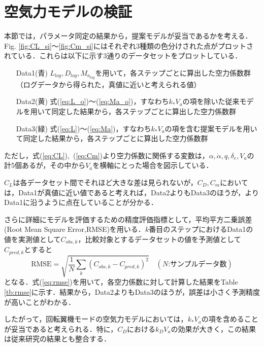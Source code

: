 \section{空気力モデルの検証}
\label{sec:airf_model_ver}

本節では，パラメータ同定の結果から，提案モデルが妥当であるかを考える．Fig. \ref{fig:CL_si}〜\ref{fig:Cm_si}にはそれぞれ3種類の色分けされた点がプロットされている．これらは以下に示す3通りのデータセットをプロットしている．

\begin{itemize}
  \setlength{\leftskip}{1.0cm}
  \setlength{\rightskip}{0.5cm}
  \item[Data1(青)] $L_{log},D_{log},M_{a_{log}}$を用いて，各ステップごとに算出した空力係数群\\（ログデータから得られた，真値に近いと考えられる値）
  \item[Data2(黄)] 式(\ref{eq:L_o})〜(\ref{eq:Ma_o})，すなわち$k_* V_a$の項を除いた従来モデルを用いて同定した結果から，各ステップごとに算出した空力係数群
  \item[Data3(緑)] 式(\ref{eq:L})〜(\ref{eq:Ma})，すなわち$k_* V_a$の項を含む提案モデルを用いて同定した結果から，各ステップごとに算出した空力係数群
\end{itemize}

ただし，式(\ref{eq:CL}),~(\ref{eq:Cm})より空力係数に関係する変数は，$\alpha,\dot{\alpha},q,\delta_e,V_a$の計5個あるが，その中から$V_a$を横軸にとった場合を図示している．

$C_L$は各データセット間でそれほど大きな差は見られないが，$C_D,C_m$においては，Data1が真値に近い値であると考えれば，Data2よりもData3のほうが，よりData1に沿うように点在していることが分かる．

さらに詳細にモデルを評価するための精度評価指標として，平均平方二乗誤差(Root Mean Square Error,RMSE)を用いる．$k$番目のステップにおけるData1の値を実測値として$C_{obs,k}$，比較対象とするデータセットの値を予測値として$C_{pred,k}$とすると
\begin{equation}
  \mbox{RMSE} = \sqrt{\dfrac{1}{N}\sum_{k}(C_{obs,k}-C_{pred,k})^{2}} \quad (N\mbox{:サンプルデータ数})
  \label{eq:rmse}
\end{equation}
となる\cite{}．式(\ref{eq:rmse})を用いて，各空力係数に対して計算した結果をTable \ref{tb:rmse}に示す．結果から，Data2よりもData3のほうが，誤差は小さく予測精度が高いことがわかる．

したがって，回転翼機モードの空気力モデルにおいては，$k_* V_a$の項を含めることが妥当であると考えられる．特に，$C_D$における$k_D V_a$の効果が大きく，この結果は従来研究\cite{}の結果とも整合する．

